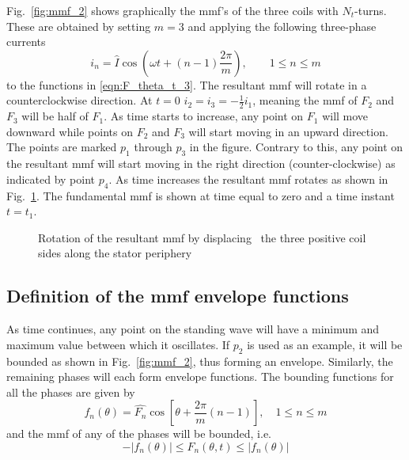 Fig.~\ref{fig:mmf_2} shows graphically the mmf's of the three coils with $N_t$-turns. These are obtained by setting $m=3$ and applying the following three-phase currents 
\begin{equation}
  \label{eqn:3ph_i}
   i_n = \hat{I}\cos\left(\omega t +(n-1)\frac{2\pi}{m}\right),
  \qquad
  1 \leq n \leq m
\end{equation}
to the functions in \eqref{eqn:F_theta_t_3}. The resultant mmf will rotate in a counterclockwise direction. At $t=0$ $i_2=i_3=-\frac{1}{2}i_1$, meaning the mmf of $F_2$ and $F_3$ will be half of $F_1$. As time starts to increase, any point on $F_1$ will move downward while points on $F_2$ and $F_3$ will start moving in an upward direction. The points are marked $p_1$ through $p_3$ in the figure. Contrary to this, any point on the resultant mmf will start moving in the right direction (counter-clockwise) as indicated by point $p_4$. As time increases the resultant mmf rotates as shown in Fig.~\ref{fig:rotating_wave}. The fundamental mmf is shown at time equal to zero and a time instant $t=t_1$.
\begin{figure}
  \centering
  \fontsize{8}{0}\selectfont
  \subfloat[$t=0$\label{fig:mmfrot0}]{
  }
  \hfill
  \subfloat[$t=t_1$\label{fig:mmfrot1}]{
  }
  \caption[Rotation of the resultant mmf]{Rotation of the resultant mmf by displacing~%
  the three positive coil sides along the stator periphery}
  \label{fig:rotating_wave}
\end{figure}

\subsection{Definition of the mmf envelope functions}\label{subsec:mmf_def}
As time continues, any point on the standing wave will have a minimum and maximum value between which it oscillates. If $p_2$ is used as an example, it will be bounded as shown in Fig.~\ref{fig:mmf_2}, thus forming an envelope. Similarly, the remaining phases will each form envelope functions. The bounding functions for all the phases are given by
\begin{equation}
  \label{eqn:f_bound}
  f_n(\theta) = \hat{F_n}\cos\left[\theta+\frac{2\pi}{m}(n-1) \right], 
  \quad 1 \leq n \leq m
\end{equation}
and the mmf of any of the phases will be bounded, i.e. 
\begin{equation}
  -\left|f_n(\theta)\right| \leq F_n(\theta ,t) \leq \left|f_n(\theta)\right|
\end{equation}

